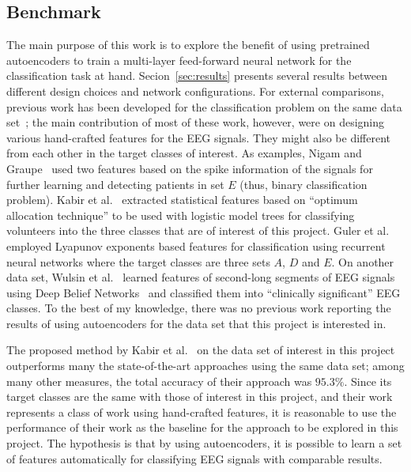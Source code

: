 \documentclass[12pt]{article}
\begin{document}
\subsection{Benchmark}
\noindent
The main purpose of this work is to explore the benefit of using pretrained autoencoders to train a multi-layer feed-forward neural network for the classification task at hand. Secion~\ref{sec:results} presents several results between different design choices and network configurations. For external comparisons, previous work has been developed for the classification problem on the same data set~\cite{andrzejak2001indications}; the main contribution of most of these work, however, were on designing various hand-crafted features for the EEG signals. They might also be different from each other in the target classes of interest. As examples, Nigam and Graupe~\cite{nigam2004neural} used two features based on the spike information of the signals for further learning and detecting patients in set $E$ (thus, binary classification problem). Kabir et al.~\cite{kabir2016epileptic} extracted statistical features based on ``optimum allocation technique'' to be used with logistic model trees for classifying volunteers into the three classes that are of interest of this project. Guler et al.~\cite{guler2005recurrent} employed Lyapunov exponents based features for classification using recurrent neural networks where the target classes are three sets $A$, $D$ and $E$. On another data set, Wulsin et al.~\cite{wulsin2011modeling} learned features of second-long segments of EEG signals using Deep Belief Networks~\cite{hinton2006reducing} and classified them into ``clinically significant'' EEG classes. To the best of my knowledge, there was no previous work reporting the results of using autoencoders for the data set that this project is interested in.

The proposed method by Kabir et al.~\cite{kabir2016epileptic} on the data set of interest in this project outperforms many the state-of-the-art approaches using the same data set; among many other measures, the total accuracy of their approach was $95.3\%$. Since its target classes are the same with those of interest in this project, and their work represents a class of work using hand-crafted features, it is reasonable to use the performance of their work as the baseline for the approach to be explored in this project. The hypothesis is that by using autoencoders, it is possible to learn a set of features automatically for classifying EEG signals with comparable results.
\end{document}
